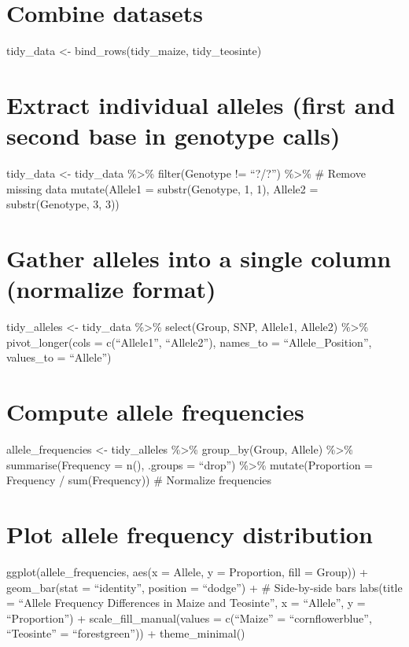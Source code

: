 \documentclass[
]{article}
\begin{document}
\section{Combine datasets}\label{combine-datasets}

tidy\_data \textless- bind\_rows(tidy\_maize, tidy\_teosinte)

\section{Extract individual alleles (first and second base in genotype
calls)}\label{extract-individual-alleles-first-and-second-base-in-genotype-calls}

tidy\_data \textless- tidy\_data \%\textgreater\% filter(Genotype !=
``?/?'') \%\textgreater\% \# Remove missing data mutate(Allele1 =
substr(Genotype, 1, 1), Allele2 = substr(Genotype, 3, 3))

\section{Gather alleles into a single column (normalize
format)}\label{gather-alleles-into-a-single-column-normalize-format}

tidy\_alleles \textless- tidy\_data \%\textgreater\% select(Group, SNP,
Allele1, Allele2) \%\textgreater\% pivot\_longer(cols = c(``Allele1'',
``Allele2''), names\_to = ``Allele\_Position'', values\_to = ``Allele'')

\section{Compute allele frequencies}\label{compute-allele-frequencies}

allele\_frequencies \textless- tidy\_alleles \%\textgreater\%
group\_by(Group, Allele) \%\textgreater\% summarise(Frequency = n(),
.groups = ``drop'') \%\textgreater\% mutate(Proportion = Frequency /
sum(Frequency)) \# Normalize frequencies

\section{Plot allele frequency
distribution}\label{plot-allele-frequency-distribution}

ggplot(allele\_frequencies, aes(x = Allele, y = Proportion, fill =
Group)) + geom\_bar(stat = ``identity'', position = ``dodge'') + \#
Side-by-side bars labs(title = ``Allele Frequency Differences in Maize
and Teosinte'', x = ``Allele'', y = ``Proportion'') +
scale\_fill\_manual(values = c(``Maize'' = ``cornflowerblue'',
``Teosinte'' = ``forestgreen'')) + theme\_minimal()
\end{document}
